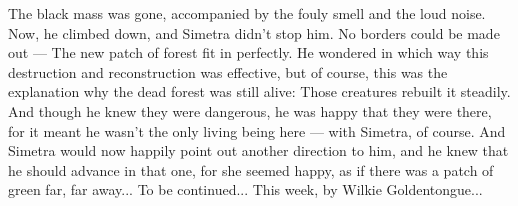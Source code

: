 The black mass was gone, accompanied by the fouly smell and the loud noise. Now, he climbed down, and Simetra didn't stop him. No borders could be made out --- The new patch of forest fit in perfectly. He wondered in which way this destruction and reconstruction was effective, but of course, this was the explanation why the dead forest was still alive: Those creatures rebuilt it steadily. 
And though he knew they were dangerous, he was happy that they were there, for it meant he wasn't the only living being here --- with Simetra, of course. 
And Simetra would now happily point out another direction to him, and he knew that he should advance in that one, for she seemed happy, as if there was a patch of green far, far away...
To be continued...
This week, by Wilkie Goldentongue...
